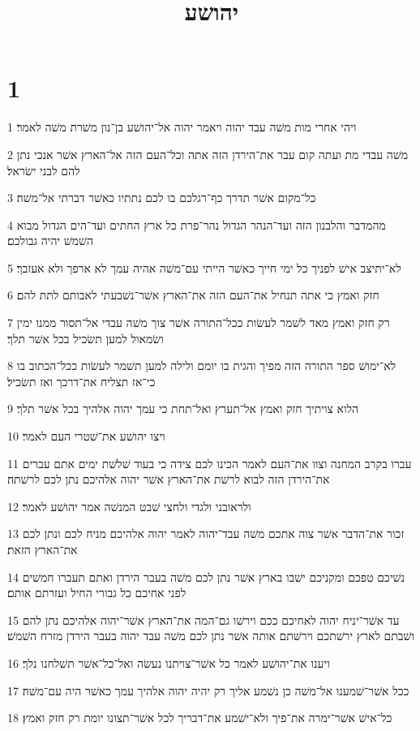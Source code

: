 

\title{יהושע}


\chapter{1}

\par 1 ויהי אחרי מות משׁה עבד יהוה ויאמר יהוה אל־יהושׁע בן־נון משׁרת משׁה לאמר׃
\par 2 משׁה עבדי מת ועתה קום עבר את־הירדן הזה אתה וכל־העם הזה אל־הארץ אשׁר אנכי נתן להם לבני ישׂראל׃
\par 3 כל־מקום אשׁר תדרך כף־רגלכם בו לכם נתתיו כאשׁר דברתי אל־משׁה׃
\par 4 מהמדבר והלבנון הזה ועד־הנהר הגדול נהר־פרת כל ארץ החתים ועד־הים הגדול מבוא השׁמשׁ יהיה גבולכם׃
\par 5 לא־יתיצב אישׁ לפניך כל ימי חייך כאשׁר הייתי עם־משׁה אהיה עמך לא ארפך ולא אעזבך׃
\par 6 חזק ואמץ כי אתה תנחיל את־העם הזה את־הארץ אשׁר־נשׁבעתי לאבותם לתת להם׃
\par 7 רק חזק ואמץ מאד לשׁמר לעשׂות ככל־התורה אשׁר צוך משׁה עבדי אל־תסור ממנו ימין ושׂמאול למען תשׂכיל בכל אשׁר תלך׃
\par 8 לא־ימושׁ ספר התורה הזה מפיך והגית בו יומם ולילה למען תשׁמר לעשׂות ככל־הכתוב בו כי־אז תצליח את־דרכך ואז תשׂכיל׃
\par 9 הלוא צויתיך חזק ואמץ אל־תערץ ואל־תחת כי עמך יהוה אלהיך בכל אשׁר תלך׃
\par 10 ויצו יהושׁע את־שׁטרי העם לאמר׃
\par 11 עברו בקרב המחנה וצוו את־העם לאמר הכינו לכם צידה כי בעוד שׁלשׁת ימים אתם עברים את־הירדן הזה לבוא לרשׁת את־הארץ אשׁר יהוה אלהיכם נתן לכם לרשׁתה׃
\par 12 ולראובני ולגדי ולחצי שׁבט המנשׁה אמר יהושׁע לאמר׃
\par 13 זכור את־הדבר אשׁר צוה אתכם משׁה עבד־יהוה לאמר יהוה אלהיכם מניח לכם ונתן לכם את־הארץ הזאת׃
\par 14 נשׁיכם טפכם ומקניכם ישׁבו בארץ אשׁר נתן לכם משׁה בעבר הירדן ואתם תעברו חמשׁים לפני אחיכם כל גבורי החיל ועזרתם אותם׃
\par 15 עד אשׁר־יניח יהוה לאחיכם ככם וירשׁו גם־המה את־הארץ אשׁר־יהוה אלהיכם נתן להם ושׁבתם לארץ ירשׁתכם וירשׁתם אותה אשׁר נתן לכם משׁה עבד יהוה בעבר הירדן מזרח השׁמשׁ׃
\par 16 ויענו את־יהושׁע לאמר כל אשׁר־צויתנו נעשׂה ואל־כל־אשׁר תשׁלחנו נלך׃
\par 17 ככל אשׁר־שׁמענו אל־משׁה כן נשׁמע אליך רק יהיה יהוה אלהיך עמך כאשׁר היה עם־משׁה׃
\par 18 כל־אישׁ אשׁר־ימרה את־פיך ולא־ישׁמע את־דבריך לכל אשׁר־תצונו יומת רק חזק ואמץ׃

